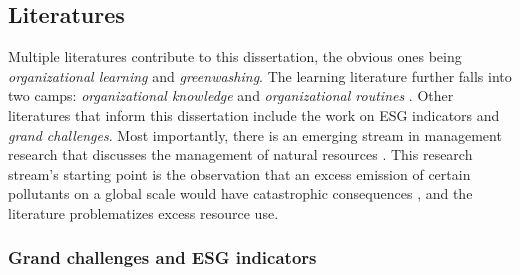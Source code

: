 \subsection{Literatures}

Multiple literatures contribute to this dissertation, the obvious ones being \textit{organizational learning} and \textit{greenwashing}. The learning literature further falls into two camps: \textit{organizational knowledge} and \textit{organizational routines} \citep{Bingham2011}. Other literatures that inform this dissertation include the work on ESG indicators and \textit{grand challenges}. Most importantly, there is an emerging stream in management research that discusses the management of natural resources \citep{George2015}. This research stream's starting point is the observation that an excess emission of certain pollutants on a global scale would have catastrophic consequences \citep{Rockstrom2009a}, and the literature problematizes excess resource use.


\subsubsection{Grand challenges and ESG indicators}

